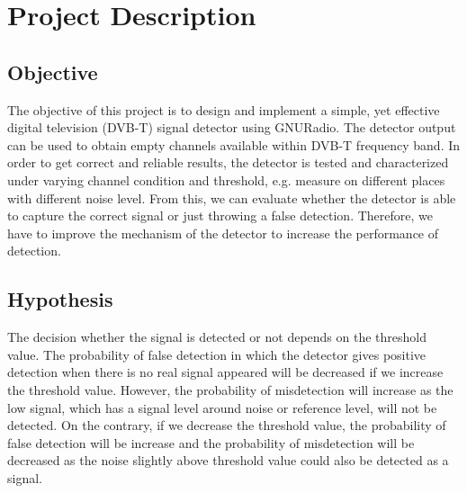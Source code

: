 \chapter{Project Description}

\section{Objective}

The objective of this project is to design and implement a simple, yet effective digital television (DVB-T) signal detector using GNURadio. The detector output can be used to obtain empty channels available within DVB-T frequency band. In order to get correct and reliable results, the detector is tested and characterized under varying channel condition and threshold, e.g. measure on different places with different noise level. From this, we can evaluate whether the detector is able to capture the correct signal or just throwing a false detection. Therefore, we have to improve the mechanism of the detector to increase the performance of detection.

\section{Hypothesis}

The decision whether the signal is detected or not depends on the threshold value. The probability of false detection in which the detector gives positive detection when there is no real signal appeared will be decreased if we increase the threshold value. However, the probability of misdetection will increase as the low signal, which has a signal level around noise or reference level, will not be detected. On the contrary, if we decrease the threshold value, the probability of false detection will be increase and the probability of misdetection will be decreased as the noise slightly above threshold value could also be detected as a signal.